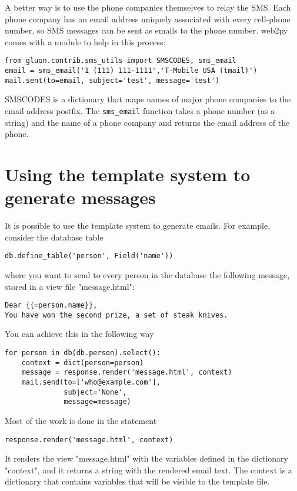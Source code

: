 \documentclass[justified,sixbynine,notoc]{tufte-book}
\def\ft{\small\tt}
\def\inxx#1{\index{#1}}
\begin{document}
\begin{fullwidth}
A better way is to use the phone companies themselves to relay the SMS. Each phone company has an email address uniquely associated with every cell-phone number, so SMS messages can be sent as emails to the phone number.
\noindent web2py comes with a module to help in this process:
\begin{lstlisting}
from gluon.contrib.sms_utils import SMSCODES, sms_email
email = sms_email('1 (111) 111-1111','T-Mobile USA (tmail)')
mail.sent(to=email, subject='test', message='test')
\end{lstlisting}

SMSCODES is a dictionary that maps names of major phone companies to the email address postfix. The {\ft sms\_email} function takes a phone number (as a string) and the name of a phone company and returns the email address of the phone.

\goodbreak\section{Using the template system to generate messages}

\inxx{emails}

It is possible to use the template system to generate emails. For example, consider the database table
\begin{lstlisting}
db.define_table('person', Field('name'))
\end{lstlisting}
\noindent where you want to send to every person in the database the following message,
stored in a view file "message.html":
\begin{lstlisting}
Dear {{=person.name}},
You have won the second prize, a set of steak knives.
\end{lstlisting}

You can achieve this in the following way
\begin{lstlisting}
for person in db(db.person).select():
    context = dict(person=person)
    message = response.render('message.html', context)
    mail.send(to=['who@example.com'],
              subject='None',
              message=message)
\end{lstlisting}

Most of the work is done in the statement
\begin{lstlisting}
response.render('message.html', context)
\end{lstlisting}

It renders the view "message.html" with the variables defined in the dictionary "context", and it returns a string with the rendered email text. The context is a dictionary that contains variables that will be visible to the template file.


\end{fullwidth}
\end{document}
